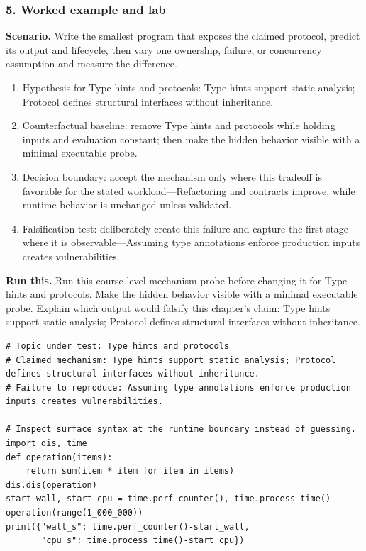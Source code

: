 \subsubsection*{5. Worked example and lab}
\textbf{Scenario.} Write the smallest program that exposes the claimed protocol, predict its output and lifecycle, then vary one ownership, failure, or concurrency assumption and measure the difference.
\begin{enumerate}
\item Hypothesis for Type hints and protocols: Type hints support static analysis; Protocol defines structural interfaces without inheritance.
\item Counterfactual baseline: remove Type hints and protocols while holding inputs and evaluation constant; then make the hidden behavior visible with a minimal executable probe.
\item Decision boundary: accept the mechanism only where this tradeoff is favorable for the stated workload—Refactoring and contracts improve, while runtime behavior is unchanged unless validated.
\item Falsification test: deliberately create this failure and capture the first stage where it is observable—Assuming type annotations enforce production inputs creates vulnerabilities.
\end{enumerate}
\textbf{Run this.} Run this course-level mechanism probe before changing it for Type hints and protocols. Make the hidden behavior visible with a minimal executable probe. Explain which output would falsify this chapter's claim: Type hints support static analysis; Protocol defines structural interfaces without inheritance.
\begin{Verbatim}[fontsize=\scriptsize]
# Topic under test: Type hints and protocols
# Claimed mechanism: Type hints support static analysis; Protocol defines structural interfaces without inheritance.
# Failure to reproduce: Assuming type annotations enforce production inputs creates vulnerabilities.

# Inspect surface syntax at the runtime boundary instead of guessing.
import dis, time
def operation(items):
    return sum(item * item for item in items)
dis.dis(operation)
start_wall, start_cpu = time.perf_counter(), time.process_time()
operation(range(1_000_000))
print({"wall_s": time.perf_counter()-start_wall,
       "cpu_s": time.process_time()-start_cpu})
\end{Verbatim}
